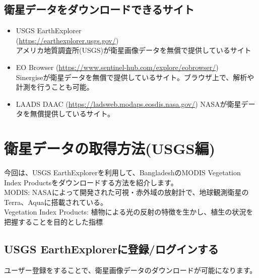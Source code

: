 \documentclass[
]{book}
\begin{document}
\hypertarget{ux885bux661fux30c7ux30fcux30bfux3092ux30c0ux30a6ux30f3ux30edux30fcux30c9ux3067ux304dux308bux30b5ux30a4ux30c8}{%
\section{衛星データをダウンロードできるサイト}\label{ux885bux661fux30c7ux30fcux30bfux3092ux30c0ux30a6ux30f3ux30edux30fcux30c9ux3067ux304dux308bux30b5ux30a4ux30c8}}

\begin{itemize}
\item
  USGS EarthExplorer\\
  (\url{https://earthexplorer.usgs.gov/})\\
  アメリカ地質調査所(USGS)が衛星画像データを無償で提供しているサイト　　
\item
  EO Browser
  (\url{https://www.sentinel-hub.com/explore/eobrowser/})\\
  Sinergiseが衛星データを無償で提供しているサイト。ブラウザ上で、解析や計測を行うことも可能。
\item
  LAADS DAAC
  (\url{https://ladsweb.modaps.eosdis.nasa.gov/})
  NASAが衛星データを無償提供しているサイト。
\end{itemize}

\hypertarget{ux885bux661fux30c7ux30fcux30bfux306eux53d6ux5f97ux65b9ux6cd5usgsux7de8}{%
\chapter{衛星データの取得方法(USGS編)}\label{ux885bux661fux30c7ux30fcux30bfux306eux53d6ux5f97ux65b9ux6cd5usgsux7de8}}

今回は、USGS EarthExplorerを利用して、BangladeshのMODIS Vegetation Index Productsをダウンロードする方法を紹介します。\\
MODIS: NASAによって開発された可視・赤外域の放射計で、地球観測衛星のTerra、Aquaに搭載されている。\\
Vegetation Index Products: 植物による光の反射の特徴を生かし、植生の状況を把握することを目的とした指標

\hypertarget{usgs-earthexplorerux306bux767bux9332ux30edux30b0ux30a4ux30f3ux3059ux308b}{%
\section{USGS EarthExplorerに登録/ログインする}\label{usgs-earthexplorerux306bux767bux9332ux30edux30b0ux30a4ux30f3ux3059ux308b}}

ユーザー登録をすることで、衛星画像データのダウンロードが可能になります。
\end{document}
